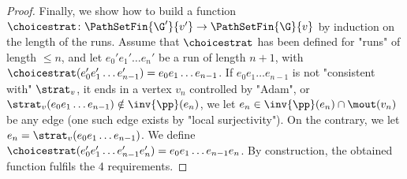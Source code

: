 \documentclass{theoretics}
\begin{document}
\begin{proof}
Finally, we show how to build a function $\choicestrat \colon \PathSetFin{\G'}{v'} \to \PathSetFin{\G}{v}$ by induction on the length of the runs. Assume that $\choicestrat$ has been defined for "runs" of length $\leq n$, and let $e_0'e_1'\dots e_n'$ be a run of length $n+1$, with $\choicestrat(e_0'e_1'\dots e_{n-1}') = e_0e_1\dots e_{n-1}$. If $e_0e_1\dots e_{n-1}$ is not "consistent with" $\strat_v$, it ends in a vertex $v_n$ controlled by "Adam", or $\strat_v(e_0e_1\dots e_{n-1})\notin \inv{\pp}(e_n)$,  we let $e_n\in \inv{\pp}(e_n)\cap \mout(v_n)$ be any edge (one such edge exists by "local surjectivity"). 
On the contrary, we let $e_n = \strat_v(e_0e_1\dots e_{n-1})$.
We define $\choicestrat(e_0'e_1'\dots e_{n-1}'e_n') = e_0e_1\dots e_{n-1}e_n$. 
By construction, the obtained function fulfils the 4 requirements.
\end{proof}
\end{document}
